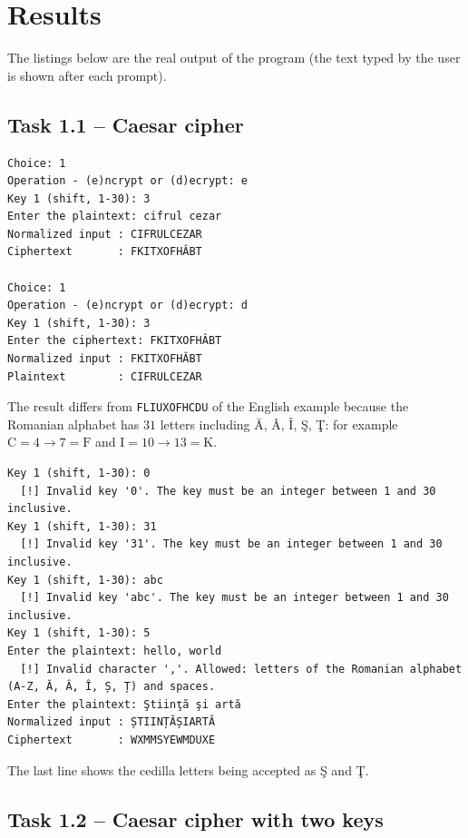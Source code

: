 \documentclass[12pt,a4paper]{article}
\begin{document}
\section{Results}

The listings below are the real output of the program (the text typed by the user
is shown after each prompt).

\subsection{Task 1.1 -- Caesar cipher}

\begin{lstlisting}[language={},numbers=none,basicstyle=\ttfamily\footnotesize,caption={Encryption and decryption with $k=3$.}]
Choice: 1
Operation - (e)ncrypt or (d)ecrypt: e
Key 1 (shift, 1-30): 3
Enter the plaintext: cifrul cezar
Normalized input : CIFRULCEZAR
Ciphertext       : FKITXOFHÂBT

Choice: 1
Operation - (e)ncrypt or (d)ecrypt: d
Key 1 (shift, 1-30): 3
Enter the ciphertext: FKITXOFHÂBT
Normalized input : FKITXOFHÂBT
Plaintext        : CIFRULCEZAR
\end{lstlisting}
The result differs from \texttt{FLIUXOFHCDU} of the English example because the
Romanian alphabet has $31$ letters including \u{A}, \^A, \^I, \c{S}, \c{T}: for
example $\text{C}=4 \to 7=\text{F}$ and $\text{I}=10\to 13=\text{K}$.

\begin{lstlisting}[language={},numbers=none,basicstyle=\ttfamily\footnotesize,caption={Task 1.1 -- invalid key and invalid character.}]
Key 1 (shift, 1-30): 0
  [!] Invalid key '0'. The key must be an integer between 1 and 30 inclusive.
Key 1 (shift, 1-30): 31
  [!] Invalid key '31'. The key must be an integer between 1 and 30 inclusive.
Key 1 (shift, 1-30): abc
  [!] Invalid key 'abc'. The key must be an integer between 1 and 30 inclusive.
Key 1 (shift, 1-30): 5
Enter the plaintext: hello, world
  [!] Invalid character ','. Allowed: letters of the Romanian alphabet (A-Z, Ă, Â, Î, Ș, Ț) and spaces.
Enter the plaintext: Ştiinţă şi artă
Normalized input : ȘTIINȚĂȘIARTĂ
Ciphertext       : WXMMSYEWMDUXE
\end{lstlisting}
The last line shows the cedilla letters being accepted as \c{S} and \c{T}.

\subsection{Task 1.2 -- Caesar cipher with two keys}
\end{document}
